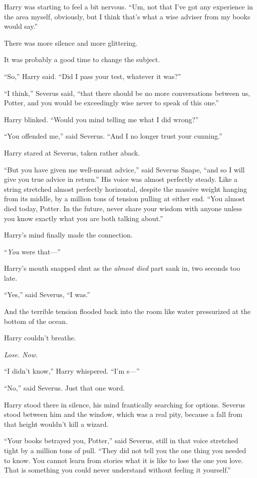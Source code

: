Harry was starting to feel a bit nervous. “Um, not that I’ve got any experience
in the area myself, obviously, but I think that’s what a wise adviser from my
books would say.”

There was more silence and more glittering.

It was probably a good time to change the subject.

“So,” Harry said. “Did I pass your test, whatever it was?”

“I think,” Severus said, “that there should be no more conversations between
us, Potter, and you would be exceedingly wise never to speak of this one.”

Harry blinked. “Would you mind telling me what I did wrong?”

“You offended me,” said Severus. “And I no longer trust your cunning.”

Harry stared at Severus, taken rather aback.

“But you have given me well-meant advice,” said Severus Snape, “and so I will
give you true advice in return.” His voice was almost perfectly steady. Like a
string stretched almost perfectly horizontal, despite the massive weight
hanging from its middle, by a million tons of tension pulling at either end.
“You almost died today, Potter. In the future, never share your wisdom with
anyone unless you know exactly what you are both talking about.”

Harry’s mind finally made the connection.

“\emph{You} were that—”

Harry’s mouth snapped shut as the \emph{almost died} part sank in, two seconds
too late.

“Yes,” said Severus, “I was.”

And the terrible tension flooded back into the room like water pressurized at
the bottom of the ocean.

Harry couldn’t breathe.

\emph{Lose. Now.}

“I didn’t know,” Harry whispered. “I’m s—”

“No,” said Severus. Just that one word.

Harry stood there in silence, his mind frantically searching for options.
Severus stood between him and the window, which was a real pity, because a fall
from that height wouldn’t kill a wizard.

“Your books betrayed you, Potter,” said Severus, still in that voice stretched
tight by a million tons of pull. “They did not tell you the one thing you
needed to know. You cannot learn from stories what it is like to lose the one
you love. That is something you could never understand without feeling it
yourself.”

